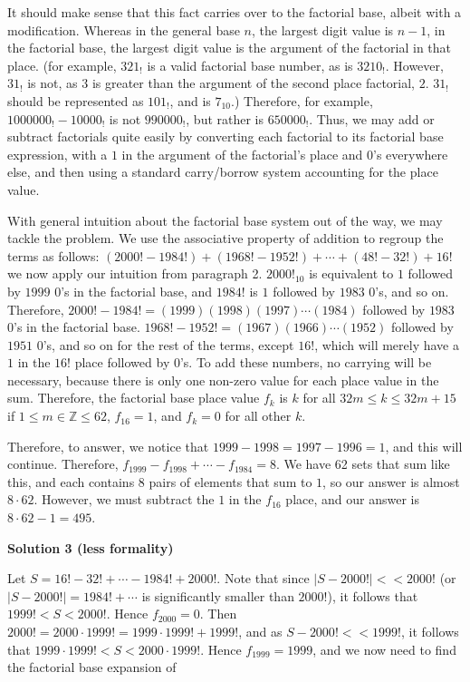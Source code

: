 \begin{enumerate}
 It should make sense that this fact carries over to the factorial base, albeit with a modification. Whereas in the general base $n$, the largest digit value is $n - 1$, in the factorial base, the largest digit value is the argument of the factorial in that place. (for example, $321_!$ is a valid factorial base number, as is $3210_!$. However, $31_!$ is not, as $3$ is greater than the argument of the second place factorial, $2$. $31_!$ should be represented as $101_!$, and is $7_{10}$.) Therefore, for example, $1000000_! - 10000_!$ is not $990000_!$, but rather is $650000_!$. Thus, we may add or subtract factorials quite easily by converting each factorial to its factorial base expression, with a $1$ in the argument of the factorial’s place and $0$’s everywhere else, and then using a standard carry/borrow system accounting for the place value. 

 With general intuition about the factorial base system out of the way, we may tackle the problem. We use the associative property of addition to regroup the terms as follows: $(2000! - 1984!) + (1968! - 1952!) + \cdots + (48! - 32!) + 16!$ we now apply our intuition from paragraph 2. $2000!_{10}$ is equivalent to $1$ followed by $1999$ $0$’s in the factorial base, and $1984!$ is $1$ followed by $1983$ $0$’s, and so on. Therefore, $2000! - 1984! = (1999)(1998)(1997)\cdots(1984)$ followed by $1983$ $0$’s in the factorial base. $1968! - 1952! = (1967)(1966)\cdots(1952)$ followed by $1951$ $0$’s, and so on for the rest of the terms, except $16!$, which will merely have a $1$ in the $16!$ place followed by $0$’s. To add these numbers, no carrying will be necessary, because there is only one non-zero value for each place value in the sum. Therefore, the factorial base place value $f_k$ is $k$ for all $32m \leq k \leq 32m+15$ if $1\leq m \in\mathbb{Z} \leq 62$, $f_{16} = 1$, and $f_k = 0$ for all other $k$. 

 Therefore, to answer, we notice that $1999 - 1998 = 1997 - 1996 = 1$, and this will continue. Therefore, $f_{1999} - f_{1998} + \cdots - f_{1984} = 8$. We have 62 sets that sum like this, and each contains $8$ pairs of elements that sum to $1$, so our answer is almost $8 \cdot 62$. However, we must subtract the $1$ in the $f_{16}$ place, and our answer is $8 \cdot 62 - 1 = \boxed{495}$.

 



\textbf{Solution 3 (less formality)}

Let $S = 16!-32!+\cdots-1984!+2000!$. Note that since $|S - 2000!| << 2000!$ (or $|S - 2000!| = 1984! + \cdots$ is significantly smaller than $2000!$), it follows that $1999! < S < 2000!$. Hence $f_{2000} = 0$. Then $2000! = 2000 \cdot 1999! = 1999 \cdot 1999! + 1999!$, and as $S - 2000! << 1999!$, it follows that $1999 \cdot 1999! < S < 2000 \cdot 1999!$. Hence $f_{1999} = 1999$, and we now need to find the factorial base expansion of 


\end{enumerate}
